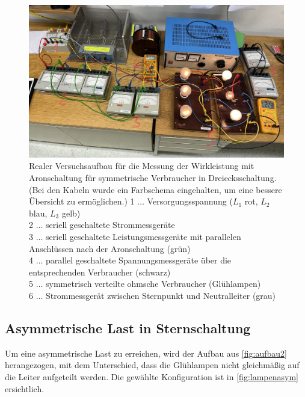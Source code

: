 \documentclass[12pt,english,ngerman]{scrartcl}
\begin{document}
\begin{figure}[H]
	\begin{center}
		\includegraphics[width = \textwidth]{./figures/aufbau2_echt.png}
	\end{center}
	\caption[Realer Versuchsaufbau für die Messung der Wirkleistung mit Aronschaltung für symmetrische
	Verbraucher in Dreiecksschaltung]
	{Realer Versuchsaufbau für die Messung der Wirkleistung mit Aronschaltung für symmetrische
	Verbraucher in Dreiecksschaltung. (Bei den Kabeln wurde ein Farbschema eingehalten, um eine bessere Übersicht zu ermöglichen.) 
	1 \(\dots\) Versorgungsspannung ($L_1$ rot, $L_2$ blau, $L_3$ gelb) \\
	2 \(\dots\) seriell geschaltete Strommessgeräte  \\
	3 \(\dots\) seriell geschaltete Leistungsmessgeräte mit parallelen Anschlüssen nach der Aronschaltung (grün)\\
	4 \(\dots\) parallel geschaltete Spannungsmessgeräte über die entsprechenden Verbraucher (schwarz)\\
	5 \(\dots\) symmetrisch verteilte ohmsche Verbraucher (Glühlampen) \\
	6 \(\dots\) Strommessgerät zwischen Sternpunkt und Neutralleiter (grau)}\label{fig:aufbau2_echt}
\end{figure}


\subsection{Asymmetrische Last in Sternschaltung}

Um eine asymmetrische Last zu erreichen, wird der Aufbau aus \autoref{fig:aufbau2} herangezogen, mit dem Unterschied, 
dass die Glühlampen nicht gleichmäßig auf die Leiter aufgeteilt werden. Die gewählte Konfiguration ist in \autoref{fig:lampenasym} ersichtlich.
\end{document}
